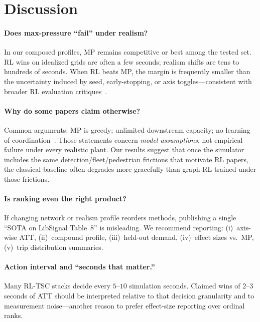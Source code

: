 \documentclass[11pt,a4paper]{article}
\begin{document}
\section{Discussion}
\label{sec:discussion}

\paragraph{Does max-pressure ``fail'' under realism?}
In our composed profiles, MP remains competitive or best among the tested set.
RL wins on idealized grids are often a few seconds; realism shifts are tens to hundreds of seconds.
When RL beats MP, the margin is frequently smaller than the uncertainty induced by seed, early-stopping, or axis toggles---consistent with broader RL evaluation critiques~\citep{henderson2018matters,agarwal2021rliable}.

\paragraph{Why do some papers claim otherwise?}
Common arguments: MP is greedy; unlimited downstream capacity; no learning of coordination~\citep{wei2019presslight,wei2019colight}.
Those statements concern \emph{model assumptions}, not empirical failure under every realistic plant.
Our results suggest that once the simulator includes the same detection/fleet/pedestrian frictions that motivate RL papers, the classical baseline often degrades more gracefully than graph RL trained under those frictions.

\paragraph{Is ranking even the right product?}
If changing network or realism profile reorders methods, publishing a single ``SOTA on LibSignal Table~8'' is misleading.
We recommend reporting: (i)~axis-wise ATT, (ii)~compound profile, (iii)~held-out demand, (iv)~effect sizes vs.\ MP, (v)~trip distribution summaries.

\paragraph{Action interval and ``seconds that matter.''}
Many RL-TSC stacks decide every $5$--$10$ simulation seconds.
Claimed wins of $2$--$3$ seconds of ATT should be interpreted relative to that decision granularity and to measurement noise---another reason to prefer effect-size reporting over ordinal ranks.
\end{document}
